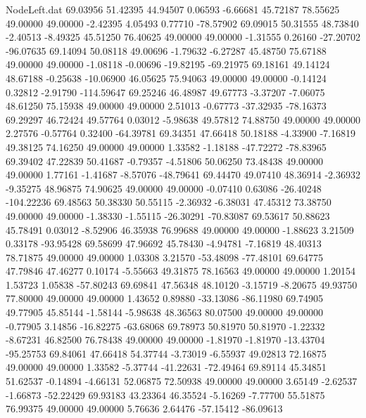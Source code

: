 \begin{filecontents}{NodeLeft.dat}
  69.03956   51.42395   44.94507     0.06593   -6.66681   45.72187   78.55625   49.00000   49.00000   -2.42395    4.05493    0.77710  -78.57902
  69.09015   50.31555   48.73840    -2.40513   -8.49325   45.51250   76.40625   49.00000   49.00000   -1.31555    0.26160  -27.20702  -96.07635
  69.14094   50.08118   49.00696    -1.79632   -6.27287   45.48750   75.67188   49.00000   49.00000   -1.08118   -0.00696  -19.82195  -69.21975
  69.18161   49.14124   48.67188    -0.25638  -10.06900   46.05625   75.94063   49.00000   49.00000   -0.14124    0.32812   -2.91790 -114.59647
  69.25246   46.48987   49.67773    -3.37207   -7.06075   48.61250   75.15938   49.00000   49.00000    2.51013   -0.67773  -37.32935  -78.16373
  69.29297   46.72424   49.57764     0.03012   -5.98638   49.57812   74.88750   49.00000   49.00000    2.27576   -0.57764    0.32400  -64.39781
  69.34351   47.66418   50.18188    -4.33900   -7.16819   49.38125   74.16250   49.00000   49.00000    1.33582   -1.18188  -47.72272  -78.83965
  69.39402   47.22839   50.41687    -0.79357   -4.51806   50.06250   73.48438   49.00000   49.00000    1.77161   -1.41687   -8.57076  -48.79641
  69.44470   49.07410   48.36914    -2.36932   -9.35275   48.96875   74.90625   49.00000   49.00000   -0.07410    0.63086  -26.40248 -104.22236
  69.48563   50.38330   50.55115    -2.36932   -6.38031   47.45312   73.38750   49.00000   49.00000   -1.38330   -1.55115  -26.30291  -70.83087
  69.53617   50.88623   45.78491     0.03012   -8.52906   46.35938   76.99688   49.00000   49.00000   -1.88623    3.21509    0.33178  -93.95428
  69.58699   47.96692   45.78430    -4.94781   -7.16819   48.40313   78.71875   49.00000   49.00000    1.03308    3.21570  -53.48098  -77.48101
  69.64775   47.79846   47.46277     0.10174   -5.55663   49.31875   78.16563   49.00000   49.00000    1.20154    1.53723    1.05838  -57.80243
  69.69841   47.56348   48.10120    -3.15719   -8.20675   49.93750   77.80000   49.00000   49.00000    1.43652    0.89880  -33.13086  -86.11980
  69.74905   49.77905   45.85144    -1.58144   -5.98638   48.36563   80.07500   49.00000   49.00000   -0.77905    3.14856  -16.82275  -63.68068
  69.78973   50.81970   50.81970    -1.22332   -8.67231   46.82500   76.78438   49.00000   49.00000   -1.81970   -1.81970  -13.43704  -95.25753
  69.84061   47.66418   54.37744    -3.73019   -6.55937   49.02813   72.16875   49.00000   49.00000    1.33582   -5.37744  -41.22631  -72.49464
  69.89114   45.34851   51.62537    -0.14894   -4.66131   52.06875   72.50938   49.00000   49.00000    3.65149   -2.62537   -1.66873  -52.22429
  69.93183   43.23364   46.35524    -5.16269   -7.77700   55.51875   76.99375   49.00000   49.00000    5.76636    2.64476  -57.15412  -86.09613

\end{filecontents}
